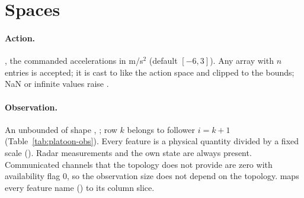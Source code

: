 \section{Spaces}\label{sec:platoon-spaces}

\paragraph{Action.} , the
commanded accelerations in m/s$^2$ (default $[-6, 3]$). Any array with $n$
entries is accepted; it is cast to  like the action space and
clipped to the bounds; NaN or infinite values raise .

\paragraph{Observation.} An unbounded  of shape ,
; row $k$ belongs to follower $i = k + 1$
(Table~\ref{tab:platoon-obs}). Every feature is a physical quantity divided by
a fixed scale (). Radar measurements and the own state
are always present. Communicated channels that the topology does not provide
are zero with availability flag 0, so the observation size does not depend on
the topology.  maps every feature name
() to its column slice.

